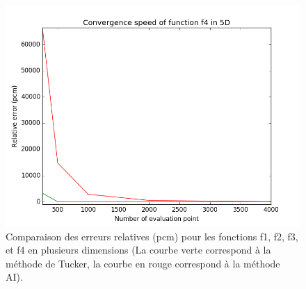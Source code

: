 \begin{figure}[h]
\begin{minipage}[b]{0.32\linewidth}
				\centering \includegraphics[scale=0.3]{images/f4_5d.png}
		\end{minipage}
\caption{Comparaison des erreurs relatives (pcm) pour les fonctions f1, f2, f3, et f4 en plusieurs dimensions (La courbe verte correspond à la méthode de Tucker, la courbe en rouge correspond à la méthode AI).}
\end{figure}

